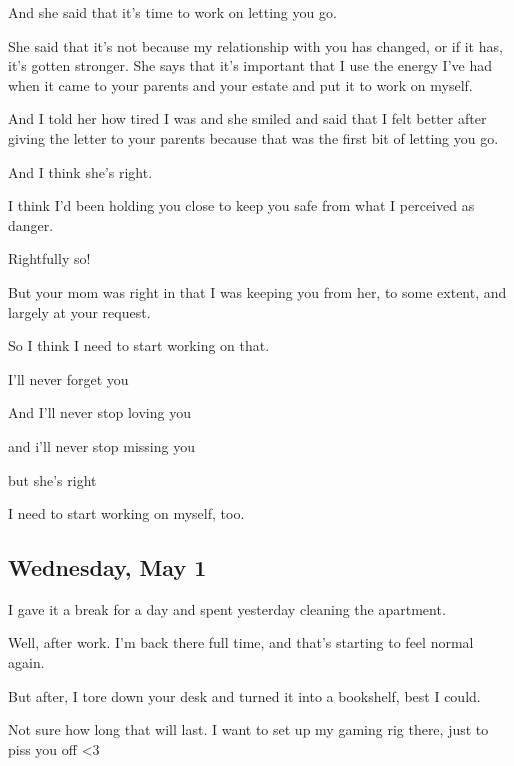 { And she said that it's time to work on letting you go.

 She said that it's not because my relationship with you has changed, or if it has, it's gotten stronger. She says that it's important that I use the energy I've had when it came to your parents and your estate and put it to work on myself.

 And I told her how tired I was and she smiled and said that I felt better after giving the letter to your parents because that was the first bit of letting you go.

 And I think she's right.

 I think I'd been holding you close to keep you safe from what I perceived as danger.

 Rightfully so!

 But your mom was right in that I was keeping you from her, to some extent, and largely at your request.

 So I think I need to start working on that.

 I'll never forget you

 And I'll never stop loving you

 and i'll never stop missing you

 but she's right

 I need to start working on myself, too.

\newpage

\subsection*{Wednesday, May 1}\label{wednesday-may-1}

 I gave it a break for a day and spent yesterday cleaning the apartment.

 Well, after work. I'm back there full time, and that's starting to feel normal again.

 But after, I tore down your desk and turned it into a bookshelf, best I could.

 Not sure how long that will last. I want to set up my gaming rig there, just to piss you off \textless{}3

}
